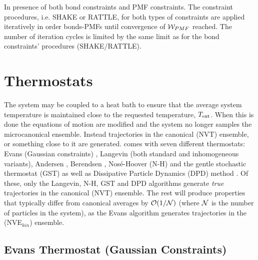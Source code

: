 In presence of both bond constraints and
PMF constraints.  The constraint procedures,
i.e. SHAKE or RATTLE, for both types of constraints are applied
iteratively in order bonds-PMFs until convergence of ${\cal W}_{PMF}$
reached.  The number of iteration cycles is limited by the same limit
as for the bond constraints' procedures (SHAKE/RATTLE).

\section{Thermostats}

The system may be coupled to a heat bath to ensure that the average
system temperature is maintained close to the requested temperature,
$T_{\rm ext}$.  When this is done the equations of motion are
modified and the system no longer samples the microcanonical
ensemble.  Instead trajectories in the canonical
(NVT) ensemble, or something close to it
are generated.  \D comes with seven different thermostats: Evans
(Gaussian constraints) \cite{evans-84a},
Langevin (both standard \cite{adelman-76a,izaguirre-01a} and
inhomogeneous \cite{duffy-07a} variants), Andersen \cite{andersen-79a},
Berendsen \cite{berendsen-84a}, Nos\'e-Hoover (N-H) \cite{hoover-85a} and
the gentle stochastic thermostat (GST) \cite{leimkuhler-09a,samoletov-07a}
as well as Dissipative Particle Dynamics (DPD) method 
\cite{hoogerbrugge-92a,espanol-95a,groot-97a,shardlow-03a}.  Of these,
only the Langevin, N-H, GST and DPD algorithms generate \emph{true}
trajectories in the canonical (NVT) ensemble.  The rest will produce
properties that typically differ from canonical averages by ${\cal O}(1/{\cal N})$
\cite{allen-89a} (where $\cal N$ is the number of particles in the system),
as the Evans algorithm generates trajectories in the (NVE$_{kin}$) ensemble.

\subsection{Evans Thermostat (Gaussian Constraints)}

